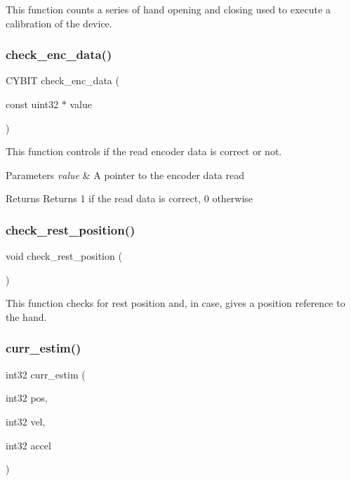 This function counts a series of hand opening and closing used to execute a calibration of the device. \mbox{\label{utils_8c_ae7faec5b3a1d000c90f70abfc1dfca92}} 
\subsubsection{check\+\_\+enc\+\_\+data()}
{\footnotesize\ttfamily C\+Y\+B\+IT check\+\_\+enc\+\_\+data (\begin{DoxyParamCaption}\item[{const uint32 $\ast$}]{value }\end{DoxyParamCaption})}

This function controls if the read encoder data is correct or not.


\begin{DoxyParams}{Parameters}
{\em value} & A pointer to the encoder data read\\
\hline
\end{DoxyParams}
\begin{DoxyReturn}{Returns}
Returns 1 if the read data is correct, 0 otherwise 
\end{DoxyReturn}
\mbox{\label{utils_8c_a13fca172b37b6f76749a864c1439b497}} 
\subsubsection{check\+\_\+rest\+\_\+position()}
{\footnotesize\ttfamily void check\+\_\+rest\+\_\+position (\begin{DoxyParamCaption}{ }\end{DoxyParamCaption})}

This function checks for rest position and, in case, gives a position reference to the hand. \mbox{\label{utils_8c_a2a9b9e0226b8dfe02b028d4f87a814ef}} 
\subsubsection{curr\+\_\+estim()}
{\footnotesize\ttfamily int32 curr\+\_\+estim (\begin{DoxyParamCaption}\item[{int32}]{pos,  }\item[{int32}]{vel,  }\item[{int32}]{accel }\end{DoxyParamCaption})}

